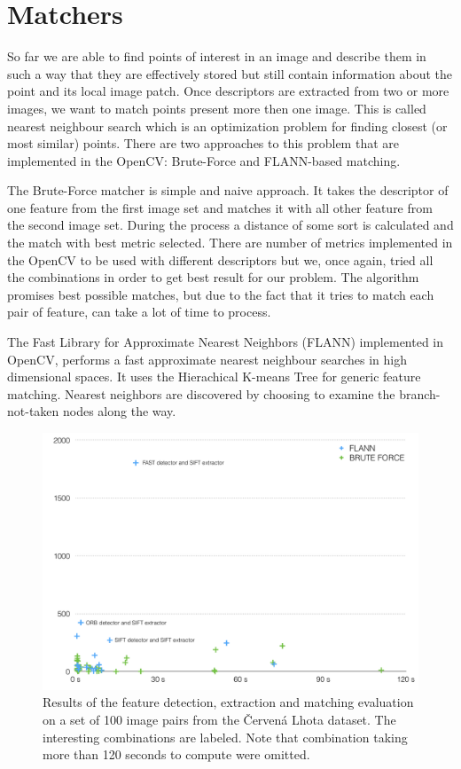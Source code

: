 \section{Matchers}
\label{sec:matchers}
So far we are able to find points of interest in an image and describe them in such a way that they are effectively stored but still contain information about the point and its local image patch. Once descriptors are extracted from two or more images, we want to match points present more then one image. This is called nearest neighbour search which is an optimization problem for finding closest (or most similar) points. There are two approaches to this problem that are implemented in the OpenCV: Brute-Force and FLANN-based matching.

The Brute-Force matcher is simple and naive approach. It takes the descriptor of one feature from the first image set and matches it with all other feature from the second image set. During the process a distance of some sort is calculated and the match with best metric selected. There are number of metrics implemented in the OpenCV to be used with different descriptors but we, once again, tried all the combinations in order to get best result for our problem. The algorithm promises best possible matches, but due to the fact that it tries to match each pair of feature, can take a lot of time to process. 

The Fast Library for Approximate Nearest Neighbors (FLANN) implemented in OpenCV, performs a fast approximate nearest neighbour searches in high dimensional spaces. It uses the Hierachical K-means Tree for generic feature matching. Nearest neighbors are discovered by choosing to examine the branch-not-taken nodes along the way. \cite{www:flann}

\begin{figure}[ht]
	\begin{center}
		\includegraphics[keepaspectratio,width=12cm]{fig/matchers.pdf}
	\end{center}
	\caption{Results of the feature detection, extraction and matching evaluation on a set of 100 image pairs from the Červená Lhota dataset. The interesting combinations are labeled. Note that combination taking more than 120 seconds to compute were omitted.}
	\label{fig:matchers}
\end{figure}

